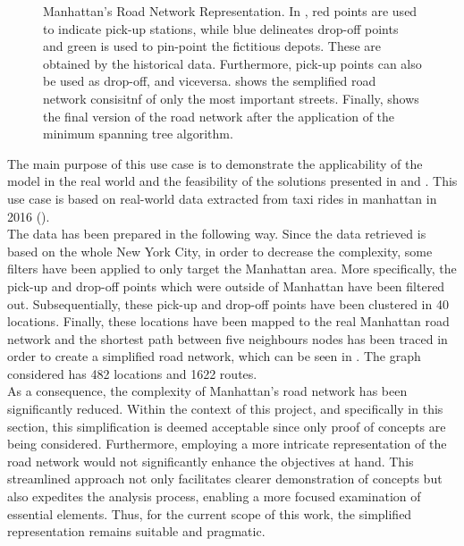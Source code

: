 \begin{figure}[tbh]
	\caption[Manhattan's Road Network Representation]{Manhattan's Road Network Representation. In , red points are used to indicate pick-up stations, while blue delineates drop-off points and green is used to pin-point the fictitious depots. These are obtained by the historical data. Furthermore, pick-up points can also be used as drop-off, and viceversa.  shows the semplified road network consisitnf of only the most important streets. Finally,  shows the final version of the road network after the application of the minimum spanning tree algorithm.  }
	\label{fig:nyc_rn}
\end{figure}
The main purpose of this use case is to demonstrate the applicability of the model in the real world and the feasibility of the solutions presented in  and . This use case is based on real-world data extracted from taxi rides in manhattan in 2016 (\cite{Donovan2014}). \\
The data has been prepared in the following way. Since the data retrieved is based on the whole New York City, in order to decrease the complexity, some filters have been applied to only target the Manhattan area. More specifically, the pick-up and drop-off points which were outside of Manhattan have been filtered out. Subsequentially, these pick-up and drop-off points have been clustered in 40 locations. Finally, these locations have been mapped to the real Manhattan road network and the shortest path between five neighbours nodes has been traced in order to create a simplified road network, which can be seen in . The graph considered has 482 locations and 1622 routes. \\
As a consequence, the complexity of Manhattan's road network has been significantly reduced. Within the context of this project, and specifically in this section, this simplification is deemed acceptable since only proof of concepts are being considered. Furthermore, employing a more intricate representation of the road network would not significantly enhance the objectives at hand. This streamlined approach not only facilitates clearer demonstration of concepts but also expedites the analysis process, enabling a more focused examination of essential elements. Thus, for the current scope of this work, the simplified representation remains suitable and pragmatic.
